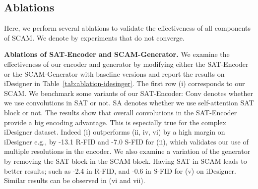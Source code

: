 \documentclass[runningheads]{llncs}
\makeatletter
\newcommand{\mname}{SCAM\@\xspace}
\makeatother
\begin{document}
\begin{comment}
\begin{table}[t]
\begin{center}
		\begin{small}
		\resizebox{\linewidth}{!}{
		\begin{tabular}{cccc|ccc}
\toprule
	
\multicolumn{2}{c}{\cellcolor{lavenderblue}{\textbf{Encoder}}} & \multicolumn{2}{c|}{\cellcolor{lavenderblue}{\textbf{Generator}}}  & \multicolumn{3}{c}{\cellcolor{lavenderblue}{\textbf{Metrics}}} \\
SEAN & SILA & SEAN & SCAM  & PSNR  & R-FID  & S-FID \\
\midrule
 & &  & & 11.11 & 82.27 & 87.31 \\  & & &  & 16.13 & 30.28 & 39.16 \\ &  & &  & \textbf{18.61} & \textbf{18.20} & \textbf{32.87}\\ 

\bottomrule
\end{tabular}
			}
		\end{small}
	\end{center}
	\caption{\small{Ablation study on LIP~\cite{Gong_2017_CVPR}.
	}}
\label{tab:ablation-lip-vic1}\\
\end{table}	
\end{comment} \subsection{Ablations}

Here, we perform several ablations to validate the effectiveness of all components of \mname. We denote by  experiments that do not converge.

\noindent \textbf{Ablations of SAT-Encoder and SCAM-Generator.}
We examine the effectiveness of our encoder and generator by modifying either the SAT-Encoder or the SCAM-Generator with baseline versions and report the results on iDesigner in Table~\ref{tab:ablation-idesinger}. The first row (i) corresponds to our \mname. 
We benchmark some variants of our SAT-Encoder: Conv denotes whether we use convolutions in SAT or not. SA denotes whether we use self-attention SAT block or not.
The results show that overall convolutions in the SAT-Encoder provide a big encoding advantage. This is especially true for the complex iDesigner dataset. Indeed (i) outperforms (ii, iv, vi) by a high margin on iDesigner e.g., by -13.1 R-FID and -7.0 S-FID for (ii), which validates our use of multiple resolutions in the encoder.
We also examine a variation of the generator by removing the SAT block in the SCAM block.
Having SAT in SCAM leads to better results; such as -2.4 in R-FID, and -0.6 in S-FID for (v) on iDesigner. Similar results can be observed in (vi and vii).
\end{document}
